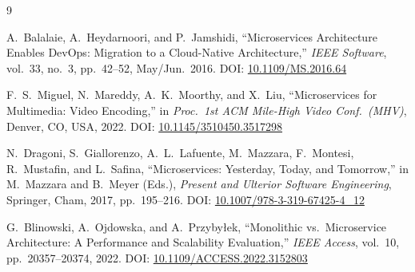 \documentclass[11pt,a4paper]{article}
\begin{document}
\begingroup
\small
\begin{thebibliography}{9}

A.~Balalaie, A.~Heydarnoori, and P.~Jamshidi,
``Microservices Architecture Enables DevOps: Migration to a Cloud-Native Architecture,''
\textit{IEEE Software}, vol.~33, no.~3, pp.~42--52, May/Jun.\ 2016.
DOI: \href{https://doi.org/10.1109/MS.2016.64}{10.1109/MS.2016.64}

F.~S.~Miguel, N.~Mareddy, A.~K.~Moorthy, and X.~Liu,
``Microservices for Multimedia: Video Encoding,''
in \textit{Proc.\ 1st ACM Mile-High Video Conf.\ (MHV)}, Denver, CO, USA, 2022.
DOI: \href{https://doi.org/10.1145/3510450.3517298}{10.1145/3510450.3517298}

N.~Dragoni, S.~Giallorenzo, A.~L.~Lafuente, M.~Mazzara, F.~Montesi,
R.~Mustafin, and L.~Safina,
``Microservices: Yesterday, Today, and Tomorrow,''
in M.~Mazzara and B.~Meyer (Eds.), \textit{Present and Ulterior Software Engineering},
Springer, Cham, 2017, pp.~195--216.
DOI: \href{https://doi.org/10.1007/978-3-319-67425-4_12}{10.1007/978-3-319-67425-4\_12}

G.~Blinowski, A.~Ojdowska, and A.~Przyby{\l}ek,
``Monolithic vs.\ Microservice Architecture: A Performance and Scalability Evaluation,''
\textit{IEEE Access}, vol.~10, pp.~20357--20374, 2022.
DOI: \href{https://doi.org/10.1109/ACCESS.2022.3152803}{10.1109/ACCESS.2022.3152803}

\end{thebibliography}
\endgroup
\end{document}
